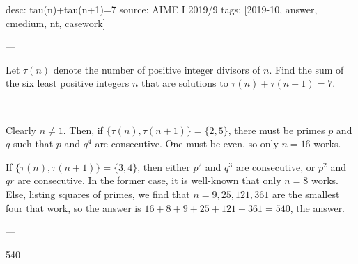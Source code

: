 desc: tau(n)+tau(n+1)=7
source: AIME I 2019/9
tags: [2019-10, answer, cmedium, nt, casework]

---

Let $\tau(n)$ denote the number of positive integer divisors of $n$. Find the sum of the six least positive integers $n$ that are solutions to $\tau(n)+\tau(n+1)=7$.

---

Clearly $n\ne 1$. Then, if $\{\tau(n),\tau(n+1)\}=\{2,5\}$, there must be primes $p$ and $q$ such that $p$ and $q^4$ are consecutive. One must be even, so only $n=16$ works.

If $\{\tau(n),\tau(n+1)\}=\{3,4\}$, then either $p^2$ and $q^3$ are consecutive, or $p^2$ and $qr$ are consecutive. In the former case, it is well-known that only $n=8$ works. Else, listing squares of primes, we find that $n=9,25,121,361$ are the smallest four that work, so the answer is $16+8+9+25+121+361=540$, the answer.

---

540

